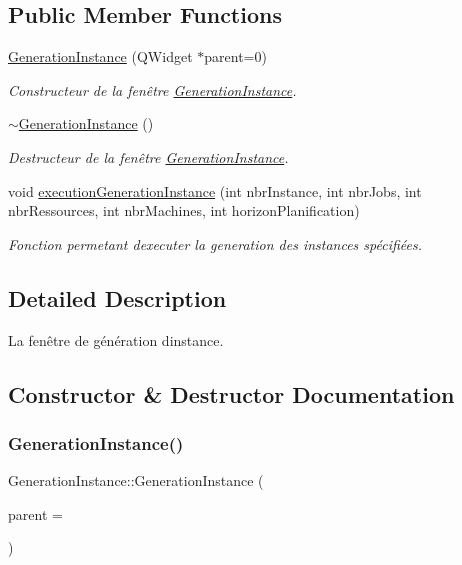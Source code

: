 \subsection*{Public Member Functions}
\begin{DoxyCompactItemize}
\item 
\hyperlink{classGenerationInstance_ac9c4a1ba1fe2f86209f116693f7c7b5b}{Generation\+Instance} (Q\+Widget $\ast$parent=0)
\begin{DoxyCompactList}\small\item\em Constructeur de la fenêtre \hyperlink{classGenerationInstance}{Generation\+Instance}. \end{DoxyCompactList}\item 
\hyperlink{classGenerationInstance_a14cdea0af4a47deb38a3a5fa59bb6d40}{$\sim$\+Generation\+Instance} ()
\begin{DoxyCompactList}\small\item\em Destructeur de la fenêtre \hyperlink{classGenerationInstance}{Generation\+Instance}. \end{DoxyCompactList}\item 
void \hyperlink{classGenerationInstance_a7e47ea4abf8249c100c253a142f9c5d0}{execution\+Generation\+Instance} (int nbr\+Instance, int nbr\+Jobs, int nbr\+Ressources, int nbr\+Machines, int horizon\+Planification)
\begin{DoxyCompactList}\small\item\em Fonction permetant d\textquotesingle{}executer la generation des instances spécifiées. \end{DoxyCompactList}\end{DoxyCompactItemize}


\subsection{Detailed Description}
La fenêtre de génération d\textquotesingle{}instance. 

\subsection{Constructor \& Destructor Documentation}
\mbox{\label{classGenerationInstance_ac9c4a1ba1fe2f86209f116693f7c7b5b}} 
\subsubsection{\texorpdfstring{Generation\+Instance()}{GenerationInstance()}}
{\footnotesize\ttfamily Generation\+Instance\+::\+Generation\+Instance (\begin{DoxyParamCaption}\item[{Q\+Widget $\ast$}]{parent = {} }\end{DoxyParamCaption})\hspace{0.3cm}{\ttfamily [explicit]}}



